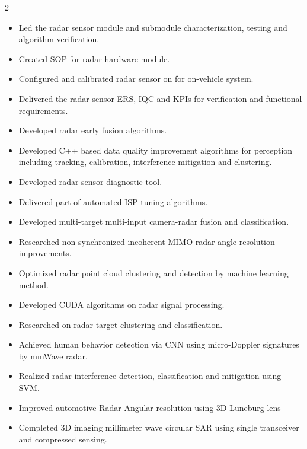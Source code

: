\documentclass[10pt,letter,ragged2e,withhyper]{leozhang}
\begin{document}
\justifying
\setlength{\columnsep}{1.5em}
\begin{paracol}{2}


\begin{itemize}
  \item Led the radar sensor module and submodule characterization, testing and algorithm verification.
  \item Created SOP for radar hardware module.
  \item Configured and calibrated radar sensor on for on-vehicle system.
  \item Delivered the radar sensor ERS, IQC and KPIs for verification and functional requirements.
  \item Developed radar early fusion algorithms.
  \item Developed C++ based data quality improvement algorithms for perception including tracking, calibration, interference mitigation and clustering.
  \item Developed radar sensor diagnostic tool.
  \item Delivered part of automated ISP tuning algorithms.
\end{itemize}

\divider

\begin{itemize}
  \item Developed multi-target multi-input camera-radar fusion and classification.
  \item Researched non-synchronized incoherent MIMO radar angle resolution improvements.
  \item Optimized radar point cloud clustering and detection by machine learning method.
  \item Developed CUDA algorithms on radar signal processing.
  \item Researched on radar target clustering and classification.
  \item Achieved human behavior detection via CNN using micro-Doppler signatures by mmWave radar.
  \item Realized radar interference detection, classification and mitigation using SVM.
  \item Improved automotive Radar Angular resolution using 3D Luneburg lens
  \item Completed 3D imaging millimeter wave circular SAR using single transceiver and compressed sensing.
\end{itemize}




\end{paracol}
\end{document}
